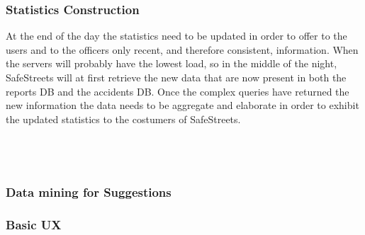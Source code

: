 \subsubsection{Statistics Construction}
At the end of the day the statistics need to be updated in order to offer to the users and to the officers only recent, and therefore consistent, information.
When the servers will probably have the lowest load, so in the middle of the night, SafeStreets will at first retrieve the new data that are now present in both the reports DB and the accidents DB. Once the complex queries have returned the new information the data needs to be aggregate and elaborate in order to exhibit the updated statistics to the costumers of SafeStreets. 
\\\\\\\\
\clearpage
\subsubsection{Data mining for Suggestions}
\clearpage
\subsubsection{Basic UX}
\clearpage